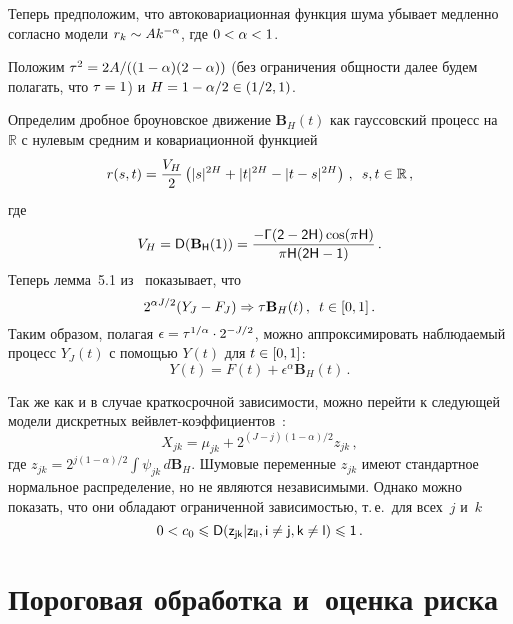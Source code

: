 \begin{multicols}{2}
Теперь предположим, что автоковариационная функция шума убывает медленно согласно 
модели $r_k \hm\sim Ak^{-\alpha}$, где $0 \hm< \alpha \hm<1$.

Положим $\tau^2 \hm= 2A/((1\hm-\alpha)(2\hm-\alpha))$ (без ограничения общности 
далее будем полагать, что $\tau\hm=1$) и $H \hm= 1- \alpha/2 \hm\in (1/2,1)$.

Определим дробное броуновское движение $\mathbf{B}_H(t)$ как
гауссовский процесс на~$\mathbb{R}$ с нулевым средним  и
ковариационной функцией
\begin{equation*}
r(s,t) = \displaystyle\frac{\displaystyle V_H\mathstrut}{\displaystyle 2\mathstrut}\left(|s|^{2H} + |t|^{2H} - |t-s|^{2H}\right)\,, \enskip s,t \in \mathbb{R}\,,
\end{equation*}
где
\begin{equation*}
V_H = \sf D (\mathbf{B}_H(1)) = \displaystyle\frac{\displaystyle -\Gamma(2-2H)\cos(\pi H)\mathstrut}{\displaystyle \pi H(2H-1)\mathstrut}\,.
\end{equation*}
Теперь лемма~5.1 из~\cite{18-she} показывает, что
\begin{equation*}
2^{\alpha J/2}(Y_J - F_J) \Rightarrow \tau\mathbf{B}_H(t)\,, \enskip t\in[0,1]\,.
\end{equation*}
Таким образом, полагая $\epsilon \hm= \tau^{1/\alpha}\cdot 2^{-J/2}$, 
можно аппроксимировать наблюдаемый процесс $Y_J(t)$ с помощью $Y(t)$ для $t\hm \in [0,1]$:
\begin{equation*}
Y(t) = F(t) + \epsilon^{\alpha} \textbf{B}_H(t)\,.
\end{equation*}

Так же как и в случае краткосрочной за\-ви\-си\-мости, можно перейти к следующей модели 
дискретных вейв\-лет-ко\-эф\-фи\-ци\-ен\-тов~\cite{16-she}:
\begin{equation}
X_{jk} = \mu_{jk} +  2^{(J-j)(1-\alpha)/2} z_{jk}\,,
\label{Wav_LRD_model}
\end{equation}
где $z_{jk}=2^{j(1-\alpha)/2} \int \psi_{jk}\, d\mathbf{B}_H$. 
Шумовые переменные $z_{jk}$ имеют стандартное нормальное распределение, 
но не являются независимыми. Однако можно показать, что они обладают 
ограниченной зависимостью, т.\,е.\ для всех~$j$ и~$k$
\begin{equation*}
0<c_0\leqslant \sf D(z_{jk}| z_{il}, i \neq j, k \neq l) \leqslant 1\,.
\end{equation*}

\section{Пороговая обработка и~оценка риска}


\end{multicols}
